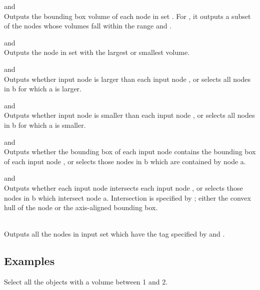 \begin{description}
	\item{ and } \\
		Outputs the bounding box volume of each node in set . For , it outputs a subset of the nodes whose volumes fall within the range  and .
	\item{ and } \\
		Outputs the node in set  with the largest or smallest volume.
	\item{ and }\\
		Outputs whether input node  is larger than each input node , or selects all nodes in b for which a is larger. 
	\item{ and }\\
		Outputs whether input node  is smaller than each input node , or selects all nodes in b for which a is smaller. 
	\item{ and } \\
		Outputs whether the bounding box of each input node  contains the bounding box of each input node , or selects those nodes in b which are contained by node a. 
	\item{ and } \\
		Outputs whether each input node  intersects each input node , or selects those nodes in b which intersect node a. Intersection is specified by ; either the convex hull of the node or the axis-aligned bounding box. 
	\item{} \\
		Outputs all the nodes in input set  which have the tag specified by  and . 
\end{description}


\subsection{Examples}

Select all the objects with a volume between 1 and 2. 

